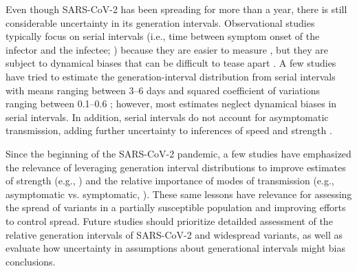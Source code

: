 \documentclass[12pt]{article}
\begin{document}
Even though SARS-CoV-2 has been spreading for more than a year, there is still considerable uncertainty in its generation intervals.
Observational studies typically focus on serial intervals (i.e., time between symptom onset of the infector and the infectee; \cite{svensson2007note}) because they are easier to measure \citep{griffin2020rapid}, but they are subject to dynamical biases that can be difficult to tease apart \citep{park2021forward}.
A few studies have tried to estimate the generation-interval distribution from serial intervals with means ranging between 3--6 days and squared coefficient of variations ranging between 0.1--0.6 \citep{ferretti2020quantifying,Ferretti2020timing,ganyani2020estimating,knight2020estimating}; 
however, most estimates neglect dynamical biases in serial intervals.
In addition, serial intervals do not account for asymptomatic transmission, adding further uncertainty to inferences of speed and strength \citep{park2020time}.

Since the beginning of the SARS-CoV-2 pandemic, a few studies have emphasized  the relevance of leveraging generation interval distributions to improve estimates of strength (e.g., \cite{doi:10.1098/rsif.2020.0144}) and the relative importance of modes of transmission (e.g., asymptomatic vs. symptomatic, \cite{park2020time}).
These same lessons have relevance for assessing the spread of variants in a partially susceptible population and improving efforts to control spread.
Future studies should prioritize detailded assessment of the relative generation intervals of SARS-CoV-2 and widespread variants, as well as evaluate how uncertainty in assumptions about generational intervals might bias conclusions.


\end{document}
